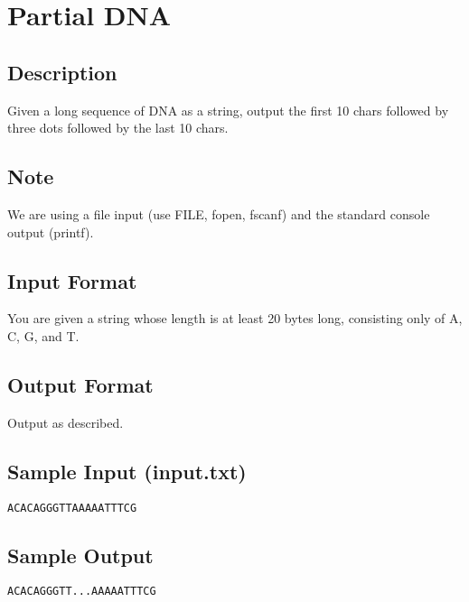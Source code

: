 

\begin{center}\end{center}
\vspace{5mm}


\section{Partial DNA}

\subsection*{Description}
Given a long sequence of DNA as a string, output the first 10 chars followed by three dots followed by the last 10 chars. 

\subsection*{Note}
We are using a file input (use FILE, fopen, fscanf) and the standard console output (printf).

\subsection*{Input Format}
You are given a string whose length is at least 20 bytes long, consisting only of A, C, G, and T.

\subsection*{Output Format}
Output as described.

\subsection*{Sample Input (input.txt)}
\begin{verbatim}
ACACAGGGTTAAAAATTTCG
\end{verbatim}

\subsection*{Sample Output}
\begin{verbatim}
ACACAGGGTT...AAAAATTTCG
\end{verbatim}




